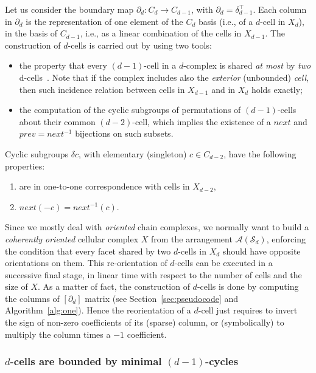 Let us consider the boundary map $\partial_d: C_d \to C_{d-1}$, with
$\partial_d=\delta_{d-1}^\top$. Each column in $\partial_d$ is the
representation of one element of the $C_d$ basis
(i.e., of a $d$-cell in $X_d$), in the basis of $C_{d-1}$, i.e., as a linear combination of the
cells in $X_{d-1}$.
The construction of $d$-cells is carried out by using two tools:

\begin{itemize}
\item
  the property that every $(d-1)$-cell in a $d$-complex is shared
  \emph{at most} by \emph{two} d-cells~\cite{hatcher:2002}. Note that if the complex includes also the \emph{exterior} (unbounded) \emph{cell}, then  such  incidence relation between cells in $X_{d-1}$ and in $X_d$ holds exactly;
\item
  the computation of the cyclic subgroups of permutations  of $(d-1)$-cells about their
  common $(d-2)$-cell, which implies the existence of a $\mathit{next}$ and
  $\mathit{prev} = \mathit{next}^{-1}$ bijections on such subsets.
\end{itemize}

Cyclic subgroups $\delta c$, with elementary (singleton) $c\in C_{d-2}$, have the following properties:

\begin{enumerate}
\item
  are in one-to-one correspondence with cells in $X_{d-2}$,
\item
  $next(-c) = next^{-1}(c)$.
\end{enumerate}

Since we mostly deal with \emph{oriented} chain complexes, we normally want to build a
\emph{coherently oriented} cellular complex $X$ from the arrangement
$\mathcal{A}(\mathcal{S}_d)$, enforcing the condition that every facet shared by two
$d$-cells in $X_d$ should have opposite orientations on them. This re-orientation of $d$-cells can be executed in a successive final stage, in linear time  with respect to the number of cells and the size of $X$. As a matter of fact, the construction of $d$-cells is done by computing the columns of $[\partial_d]$ matrix (see Section~\ref{sec:pseudocode} and Algorithm~\ref{alg:one}). Hence the reorientation of a $d$-cell just requires to invert the sign of non-zero coefficients of its (sparse) column, or (symbolically) to multiply the column times a $-1$ coefficient.

\subsubsection{$d$-cells are {bounded by} minimal $(d-1)$-cycles}
\label{sec:cycles}

